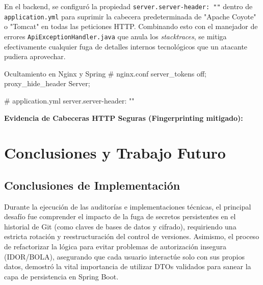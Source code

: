 \documentclass[11pt,oneside]{article}
\begin{document}
En el backend, se configuró la propiedad \texttt{server.server-header: ""} dentro de \texttt{application.yml} para suprimir la cabecera predeterminada de "Apache Coyote" o "Tomcat" en todas las peticiones HTTP. Combinando esto con el manejador de errores \texttt{ApiExceptionHandler.java} que anula los \textit{stacktraces}, se mitiga efectivamente cualquier fuga de detalles internos tecnológicos que un atacante pudiera aprovechar.

\begin{codewindow}[language=Text]{Ocultamiento en Nginx y Spring}
# nginx.conf
server_tokens off;
proxy_hide_header Server;

# application.yml
server.server-header: ""
\end{codewindow}

\textbf{Evidencia de Cabeceras HTTP Seguras (Fingerprinting mitigado):}

\section{Conclusiones y Trabajo Futuro}

\subsection{Conclusiones de Implementación}
Durante la ejecución de las auditorías e implementaciones técnicas, el principal desafío fue comprender el impacto de la fuga de secretos persistentes en el historial de Git (como claves de bases de datos y cifrado), requiriendo una estricta rotación y reestructuración del control de versiones. Asimismo, el proceso de refactorizar la lógica para evitar problemas de autorización insegura (IDOR/BOLA), asegurando que cada usuario interactúe solo con sus propios datos, demostró la vital importancia de utilizar DTOs validados para sanear la capa de persistencia en Spring Boot.
\end{document}
